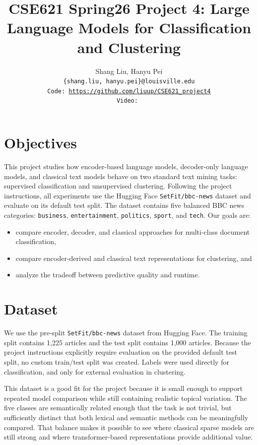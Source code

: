 \documentclass{article}
\title{CSE621 Spring26 Project 4: Large Language Models for Classification and Clustering}
\author{
Shang Liu, Hanyu Pei \\
\texttt{\small{\{shang.liu, hanyu.pei\}@louisville.edu}} \\
\texttt{\small{Code: \url{https://github.com/liuup/CSE621_project4}}} \\
\texttt{\small{Video: }} \\
}
\begin{document}
\maketitle

\section{Objectives}

This project studies how encoder-based language models, decoder-only language models, and classical text models behave on two standard text mining tasks: supervised classification and unsupervised clustering. Following the project instructions, all experiments use the Hugging Face \texttt{SetFit/bbc-news} dataset and evaluate on its default test split. The dataset contains five balanced BBC news categories: \texttt{business}, \texttt{entertainment}, \texttt{politics}, \texttt{sport}, and \texttt{tech}. Our goals are:

\begin{itemize}
\item compare encoder, decoder, and classical approaches for multi-class document classification,
\item compare encoder-derived and classical text representations for clustering, and
\item analyze the tradeoff between predictive quality and runtime.
\end{itemize}

\section{Dataset}

We use the pre-split \texttt{SetFit/bbc-news} dataset from Hugging Face. The training split contains 1,225 articles and the test split contains 1,000 articles. Because the project instructions explicitly require evaluation on the provided default test split, no custom train/test split was created. Labels were used directly for classification, and only for external evaluation in clustering.

This dataset is a good fit for the project because it is small enough to support repeated model comparison while still containing realistic topical variation. The five classes are semantically related enough that the task is not trivial, but sufficiently distinct that both lexical and semantic methods can be meaningfully compared. That balance makes it possible to see where classical sparse models are still strong and where transformer-based representations provide additional value.
\end{document}
